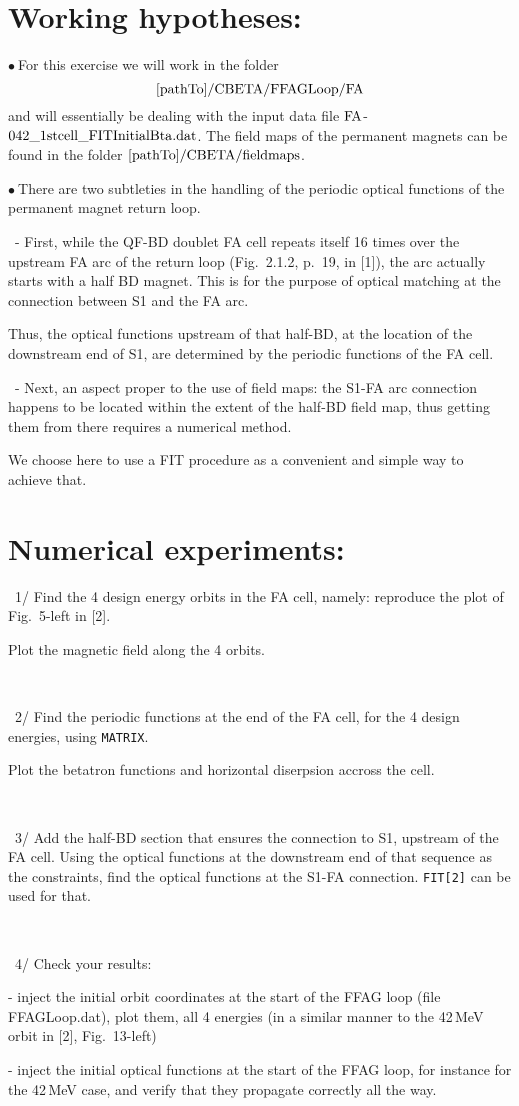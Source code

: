 \documentclass[10pt]{article}
\newcommand{\nib}{\noindent \ensuremath{\bullet~}}
\newcommand{\nin}{\noindent~}
\begin{document}
\section*{Working hypotheses:}

\nib For this exercise we will work in the folder
$$\rm [pathTo]/CBETA/FFAGLoop/FA $$
and will essentially be dealing with the input data  file $\rm FA$-$\rm 042\_1stcell\_FITInitialBta.dat$. 
The field maps of the permanent magnets can be found in the folder $\rm [pathTo]/CBETA/fieldmaps$.

\smallskip

\nib There are two subtleties in the handling of the periodic optical functions of the permanent magnet return loop.

\nin - First, while the QF-BD doublet FA cell repeats itself 16 times over the upstream FA arc of the return loop (Fig.~2.1.2, p.~19, in [1]), the arc actually starts with a half BD magnet.
This is for the purpose of optical matching at the connection between S1 and the FA arc. 

Thus, the optical functions upstream of that half-BD, at the location of the downstream end of S1, are determined by the periodic functions of the FA cell.

\nin - Next, an aspect proper to the use of field maps:  the S1-FA arc connection happens to be located within the extent of
the half-BD field map, thus getting them from there requires a numerical method.

We choose here to use a FIT procedure as a convenient and simple way to achieve that.



\section*{ Numerical experiments: }


\nin 1/ Find the 4 design energy orbits in the FA cell, namely: reproduce the plot of Fig.~5-left in [2]. 

Plot the magnetic field along the 4 orbits.

~

\nin 2/ Find the periodic functions at the end of the FA cell, for the 4 design energies, using \texttt{MATRIX}.

Plot the betatron functions and horizontal diserpsion accross the cell.

~

\nin 3/ Add the half-BD section that ensures the connection to S1,
upstream of the FA cell. Using the optical functions at the downstream end of that sequence as
the constraints, find the optical functions at the S1-FA connection.  \texttt{FIT[2]} can be used for that. 

~

\nin 4/ Check your results:

- inject the initial orbit coordinates at the start of the FFAG loop (file FFAGLoop.dat),
plot them, all 4 energies (in a similar manner to the 42\,MeV orbit in [2], Fig.~13-left)

- inject the initial optical functions at the start of the FFAG loop, 
for instance for the 42\,MeV case, and verify that they propagate correctly all the way. 

 
\end{document}
